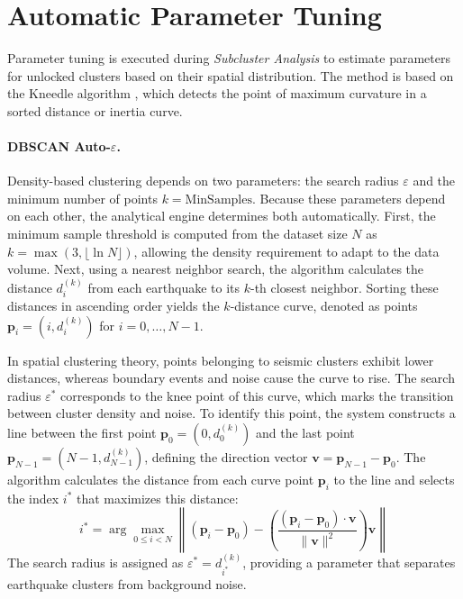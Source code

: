\section{Automatic Parameter Tuning}
\label{sec:auto-tuning}

Parameter tuning is executed during \textit{Subcluster Analysis} to estimate parameters for unlocked clusters based on their spatial distribution. The method is based on the Kneedle algorithm \cite{satopaa2011kneedle}, which detects the point of maximum curvature in a sorted distance or inertia curve.

\paragraph{DBSCAN Auto-$\varepsilon$.}
Density-based clustering depends on two parameters: the search radius $\varepsilon$ and the minimum number of points $k = \text{MinSamples}$. Because these parameters depend on each other, the analytical engine determines both automatically. First, the minimum sample threshold is computed from the dataset size $N$ as $k = \max(3, \lfloor \ln N \rfloor)$, allowing the density requirement to adapt to the data volume. Next, using a nearest neighbor search, the algorithm calculates the distance $d_i^{(k)}$ from each earthquake to its $k$-th closest neighbor. Sorting these distances in ascending order yields the $k$-distance curve, denoted as points $\mathbf{p}_i = (i, d_i^{(k)})$ for $i = 0, \dots, N-1$.

In spatial clustering theory, points belonging to seismic clusters exhibit lower distances, whereas boundary events and noise cause the curve to rise. The search radius $\varepsilon^*$ corresponds to the knee point of this curve, which marks the transition between cluster density and noise. To identify this point, the system constructs a line between the first point $\mathbf{p}_0 = (0, d_0^{(k)})$ and the last point $\mathbf{p}_{N-1} = (N-1, d_{N-1}^{(k)})$, defining the direction vector $\mathbf{v} = \mathbf{p}_{N-1} - \mathbf{p}_0$. The algorithm calculates the distance from each curve point $\mathbf{p}_i$ to the line and selects the index $i^*$ that maximizes this distance:
\begin{equation}
    i^* = \arg\max_{0 \le i < N} \left\| (\mathbf{p}_i - \mathbf{p}_0) - \left( \frac{(\mathbf{p}_i - \mathbf{p}_0) \cdot \mathbf{v}}{\|\mathbf{v}\|^2} \right) \mathbf{v} \right\|
    \label{eq:max-curvature}
\end{equation}
The search radius is assigned as $\varepsilon^* = d_{i^*}^{(k)}$, providing a parameter that separates earthquake clusters from background noise.

